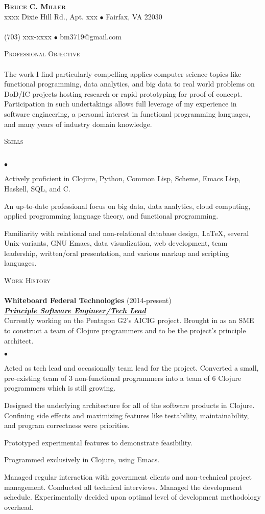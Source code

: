 \documentclass{article}
\newcommand{\lineunder}{\vspace*{-8pt} \\ \hspace*{-18pt} \hrulefill \\}
\newcommand{\header}[1]{{\hspace*{-15pt}\vspace*{7pt} \textsc{#1}} \vspace*{-7pt} \lineunder}
\newcommand{\employer}[3]{{ \textbf{#1} (#2)\\ \underline{\textbf{\emph{#3}}}\\  }}
\newcommand{\contact}[3]{
\vspace*{-8pt}
\begin{center}
{\LARGE \scshape {#1}}\\
#2 \lineunder
#3
\end{center}
\vspace*{-8pt}
}
\newenvironment{achievements}{\begin{list}{$\bullet$}{\topsep 0pt \itemsep
      -2pt}}{\vspace*{4pt}\end{list}}
\begin{document}
\small
\smallskip
\vspace*{-44pt}

\contact{\textbf{Bruce C. Miller}}
{xxxx Dixie Hill Rd., Apt. xxx $\bullet$ Fairfax, VA 22030}
{(703) xxx-xxxx $\bullet$ bm3719@gmail.com}

\header{Professional Objective} The work I find particularly compelling applies
computer science topics like functional programming, data analytics, and big
data to real world problems on DoD/IC projects hosting research or rapid
prototyping for proof of concept.  Participation in such undertakings allows
full leverage of my experience in software engineering, a personal interest in
functional programming languages, and many years of industry domain knowledge.
\vspace{7pt}

\header{Skills}
\begin{achievements}
\item Actively proficient in Clojure, Python, Common Lisp, Scheme, Emacs Lisp,
  Haskell, SQL, and C.
\item An up-to-date professional focus on big data, data analytics, cloud
  computing, applied programming language theory, and functional programming.
\item Familiarity with relational and non-relational database design, \LaTeX,
  several Unix-variants, GNU Emacs, data visualization, web development, team
  leadership, written/oral presentation, and various markup and scripting
  languages.
\end{achievements}

\header{Work History}

\employer{Whiteboard Federal Technologies}{2014-present}{Principle Software
  Engineer/Tech Lead} Currently working on the Pentagon G2's AICIG project.
Brought in as an SME to construct a team of Clojure programmers and to be the
project's principle architect.
\begin{achievements}
\item Acted as tech lead and occasionally team lead for the project.  Converted
  a small, pre-existing team of 3 non-functional programmers into a team of 6
  Clojure programmers which is still growing.
\item Designed the underlying architecture for all of the software products in
  Clojure.  Confining side effects and maximizing features like testability,
  maintainability, and program correctness were priorities.
\item Prototyped experimental features to demonstrate feasibility.
\item Programmed exclusively in Clojure, using Emacs.
\item Managed regular interaction with government clients and non-technical
  project management.  Conducted all technical interviews.  Managed the
  development schedule.  Experimentally decided upon optimal level of
  development methodology overhead.
\end{achievements}
\end{document}
